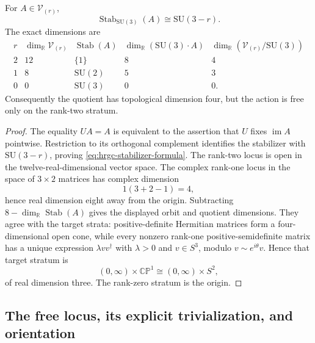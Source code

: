 \begin{proposition}
\label{prop:hrgc-stabilizers}
For \(A\in\mathscr V_{(r)}\),
\begin{equation}
 \operatorname{Stab}_{\mathrm{SU}(3)}(A)\cong\mathrm{SU}(3-r).
 \label{eq:hrgc-stabilizer-formula}
\end{equation}
The exact dimensions are
\begin{equation}
 \begin{array}{c|c|c|c|c}
 r&\dim_{\mathbb R}\mathscr V_{(r)}&\operatorname{Stab}(A)&
 \dim_{\mathbb R}(\mathrm{SU}(3)\cdot A)&
 \dim_{\mathbb R}(\mathscr V_{(r)}/\mathrm{SU}(3))\\ \hline
 2&12&\{1\}&8&4\\
 1&8&\mathrm{SU}(2)&5&3\\
 0&0&\mathrm{SU}(3)&0&0.
 \end{array}
 \label{eq:hrgc-stratum-table}
\end{equation}
Consequently the quotient has topological dimension four, but the action is
free only on the rank-two stratum.
\end{proposition}

\begin{proof}
The equality \(UA=A\) is equivalent to the assertion that \(U\) fixes
\(\operatorname{im}A\) pointwise.  Restriction to its orthogonal complement
identifies the stabilizer with \(\mathrm{SU}(3-r)\), proving
\eqref{eq:hrgc-stabilizer-formula}.  The rank-two locus is open in the
twelve-real-dimensional vector space.  The complex rank-one locus in the
space of \(3\times2\) matrices has complex dimension
\[
 1(3+2-1)=4,
\]
hence real dimension eight away from the origin.  Subtracting
\(8-\dim_{\mathbb R}\operatorname{Stab}(A)\) gives the displayed orbit and
quotient dimensions.  They agree with the target strata: positive-definite
Hermitian matrices form a four-dimensional open cone, while every nonzero
rank-one positive-semidefinite matrix has a unique expression
\(\lambda vv^\dagger\) with \(\lambda>0\) and \(v\in S^3\), modulo
\(v\sim e^{i\theta}v\).  Hence that target stratum is
\[
 (0,\infty)\times\mathbb{CP}^1
 \cong(0,\infty)\times S^2,
\]
of real dimension three.  The rank-zero stratum is the origin.
\end{proof}

\subsection{The free locus, its explicit trivialization, and orientation}

